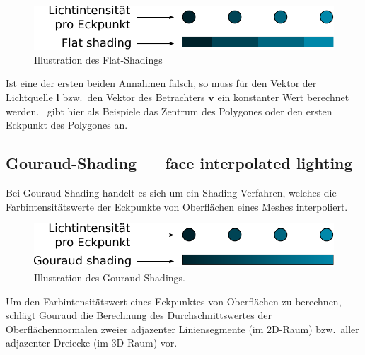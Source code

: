 \begin{figure}[H]
    \centering
    \includegraphics{img/flat_shading.pdf}
    \caption{Illustration des Flat-Shadings\protect\footnotemark}\label{
        fig:flat_shading_illustration}
\end{figure}

Ist eine der ersten beiden Annahmen falsch, so muss für den Vektor der
Lichtquelle $\bm{l}$ bzw.\ den Vektor des Betrachters $\bm{v}$ ein
konstanter Wert berechnet werden.~\citeauthor{foley_computer_1996} gibt
hier als Beispiele das Zentrum des Polygones oder den ersten Eckpunkt
des Polygones an.

\subsection{Gouraud-Shading --- face interpolated lighting}
\label{subsec:gouraud_shading}

Bei Gouraud-Shading handelt es sich um ein Shading-Verfahren, welches die
Farbintensitätswerte der Eckpunkte von Oberflächen eines Meshes interpoliert.

\begin{figure}[H]
    \centering
    \includegraphics{img/gouraud_shading.pdf}
    \caption{Illustration des Gouraud-Shadings\protect\footnotemark.}\label{
        fig:gouraud_shading_illustration}
\end{figure}

Um den Farbintensitätswert eines Eckpunktes von Oberflächen  zu berechnen,
schlägt Gouraud die Berechnung des Durchschnittswertes der Oberflächennormalen
zweier adjazenter Liniensegmente (im 2D-Raum) bzw.\  aller adjazenter Dreiecke
(im 3D-Raum) vor.

